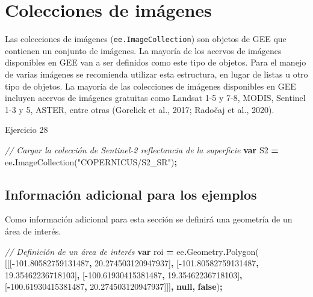 \documentclass[
  12pt,
  letterpaper,
  twoside]{book}
\newenvironment{Shaded}{\begin{snugshade}}{\end{snugshade}}
\newcommand{\AttributeTok}[1]{\textcolor[rgb]{0.77,0.63,0.00}{#1}}
\newcommand{\CommentTok}[1]{\textcolor[rgb]{0.56,0.35,0.01}{\textit{#1}}}
\newcommand{\FloatTok}[1]{\textcolor[rgb]{0.00,0.00,0.81}{#1}}
\newcommand{\FunctionTok}[1]{\textcolor[rgb]{0.00,0.00,0.00}{#1}}
\newcommand{\KeywordTok}[1]{\textcolor[rgb]{0.13,0.29,0.53}{\textbf{#1}}}
\newcommand{\NormalTok}[1]{#1}
\newcommand{\OperatorTok}[1]{\textcolor[rgb]{0.81,0.36,0.00}{\textbf{#1}}}
\newcommand{\StringTok}[1]{\textcolor[rgb]{0.31,0.60,0.02}{#1}}
\begin{document}
\newpage

\hypertarget{colecciones-de-imuxe1genes}{%
\chapter{Colecciones de imágenes}\label{colecciones-de-imuxe1genes}}

Las colecciones de imágenes (\texttt{ee.ImageCollection}) son objetos de GEE que contienen un conjunto de imágenes. La mayoría de los acervos de imágenes disponibles en GEE van a ser definidos como este tipo de objetos. Para el manejo de varias imágenes se recomienda utilizar esta estructura, en lugar de listas u otro tipo de objetos. La mayoría de las colecciones de imágenes disponibles en GEE incluyen acervos de imágenes gratuitas como Landsat 1-5 y 7-8, MODIS, Sentinel 1-3 y 5, ASTER, entre otras (Gorelick et al., 2017; Radočaj et al., 2020).

Ejercicio 28

\begin{Shaded}
\begin{Highlighting}[]
\CommentTok{// Cargar la colección de Sentinel{-}2 reflectancia de la superficie}
\KeywordTok{var}\NormalTok{ S2 }\OperatorTok{=}\NormalTok{ ee}\OperatorTok{.}\FunctionTok{ImageCollection}\NormalTok{(}\StringTok{"COPERNICUS/S2\_SR"}\NormalTok{)}\OperatorTok{;}
\end{Highlighting}
\end{Shaded}

\hypertarget{informaciuxf3n-adicional-para-los-ejemplos-1}{%
\section{Información adicional para los ejemplos}\label{informaciuxf3n-adicional-para-los-ejemplos-1}}

Como información adicional para esta sección se definirá una geometría de un área de interés.

\begin{Shaded}
\begin{Highlighting}[]
\CommentTok{// Definición de un área de interés}
\KeywordTok{var}\NormalTok{ roi }\OperatorTok{=}\NormalTok{ ee}\OperatorTok{.}\AttributeTok{Geometry}\OperatorTok{.}\FunctionTok{Polygon}\NormalTok{(}
\NormalTok{        [[[}\OperatorTok{{-}}\FloatTok{101.80582759131487}\OperatorTok{,} \FloatTok{20.274503120947937}\NormalTok{]}\OperatorTok{,}
\NormalTok{          [}\OperatorTok{{-}}\FloatTok{101.80582759131487}\OperatorTok{,} \FloatTok{19.35462236718103}\NormalTok{]}\OperatorTok{,}
\NormalTok{          [}\OperatorTok{{-}}\FloatTok{100.61930415381487}\OperatorTok{,} \FloatTok{19.35462236718103}\NormalTok{]}\OperatorTok{,}
\NormalTok{          [}\OperatorTok{{-}}\FloatTok{100.61930415381487}\OperatorTok{,} \FloatTok{20.274503120947937}\NormalTok{]]]}\OperatorTok{,} \KeywordTok{null}\OperatorTok{,} \KeywordTok{false}\NormalTok{)}\OperatorTok{;}
\end{Highlighting}
\end{Shaded}
\end{document}
